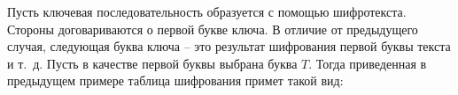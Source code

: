 \example
Пусть ключевая последовательность образуется с помощью шифротекста. Стороны договариваются о первой букве ключа. В отличие от предыдущего случая, следующая буква ключа -- это результат
шифрования первой буквы текста и т.~д. Пусть в качестве первой буквы выбрана буква  $T$. Тогда приведенная в предыдущем примере таблица шифрования примет такой вид:
\begin{center}  \end{center}
\exampleend
